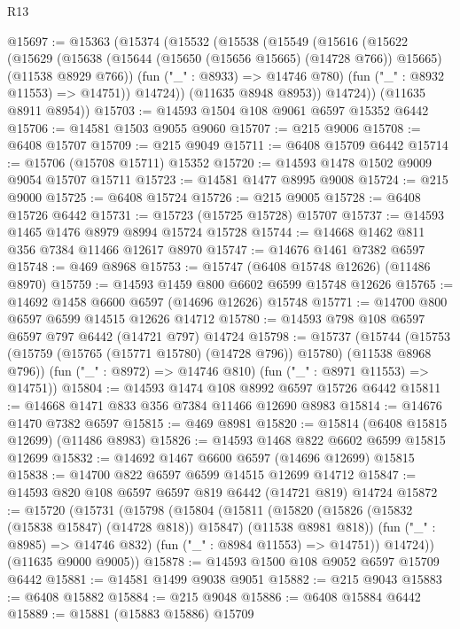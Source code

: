 \begin{lexlean}{R13}
\begin{coremodule}
@15697 := @15363
    (@15374
      (@15532
        (@15538
          (@15549
            (@15616
              (@15622
                (@15629
                  (@15638
                    (@15644 (@15650 (@15656 @15665) (@14728 @766)) @15665)
                    (@11538 @8929 @766))
                  (fun ("_" : @8933) => @14746 @780)
                  (fun ("_" : @8932 @11553) => @14751))
                @14724))
            (@11635 @8948 @8953))
          @14724))
      (@11635 @8911 @8954))
@15703 := @14593 @1504 @108 @9061 @6597 @15352 @6442
@15706 := @14581 @1503 @9055 @9060
@15707 := @215 @9006
@15708 := @6408 @15707
@15709 := @215 @9049
@15711 := @6408 @15709 @6442
@15714 := @15706 (@15708 @15711) @15352
@15720 := @14593 @1478 @1502 @9009 @9054 @15707 @15711
@15723 := @14581 @1477 @8995 @9008
@15724 := @215 @9000
@15725 := @6408 @15724
@15726 := @215 @9005
@15728 := @6408 @15726 @6442
@15731 := @15723 (@15725 @15728) @15707
@15737 := @14593 @1465 @1476 @8979 @8994 @15724 @15728
@15744 := @14668 @1462 @811 @356 @7384 @11466 @12617 @8970
@15747 := @14676 @1461 @7382 @6597
@15748 := @469 @8968
@15753 := @15747 (@6408 @15748 @12626) (@11486 @8970)
@15759 := @14593 @1459 @800 @6602 @6599 @15748 @12626
@15765 := @14692 @1458 @6600 @6597 (@14696 @12626) @15748
@15771 := @14700 @800 @6597 @6599 @14515 @12626 @14712
@15780 := @14593 @798 @108 @6597 @6597 @797 @6442 (@14721 @797) @14724
@15798 := @15737
    (@15744
      (@15753 (@15759 (@15765 (@15771 @15780) (@14728 @796)) @15780) (@11538 @8968 @796))
      (fun ("_" : @8972) => @14746 @810)
      (fun ("_" : @8971 @11553) => @14751))
@15804 := @14593 @1474 @108 @8992 @6597 @15726 @6442
@15811 := @14668 @1471 @833 @356 @7384 @11466 @12690 @8983
@15814 := @14676 @1470 @7382 @6597
@15815 := @469 @8981
@15820 := @15814 (@6408 @15815 @12699) (@11486 @8983)
@15826 := @14593 @1468 @822 @6602 @6599 @15815 @12699
@15832 := @14692 @1467 @6600 @6597 (@14696 @12699) @15815
@15838 := @14700 @822 @6597 @6599 @14515 @12699 @14712
@15847 := @14593 @820 @108 @6597 @6597 @819 @6442 (@14721 @819) @14724
@15872 := @15720
    (@15731
      (@15798
        (@15804
          (@15811
            (@15820 (@15826 (@15832 (@15838 @15847) (@14728 @818)) @15847) (@11538 @8981 @818))
            (fun ("_" : @8985) => @14746 @832)
            (fun ("_" : @8984 @11553) => @14751))
          @14724))
      (@11635 @9000 @9005))
@15878 := @14593 @1500 @108 @9052 @6597 @15709 @6442
@15881 := @14581 @1499 @9038 @9051
@15882 := @215 @9043
@15883 := @6408 @15882
@15884 := @215 @9048
@15886 := @6408 @15884 @6442
@15889 := @15881 (@15883 @15886) @15709

\end{coremodule}
\end{lexlean}
